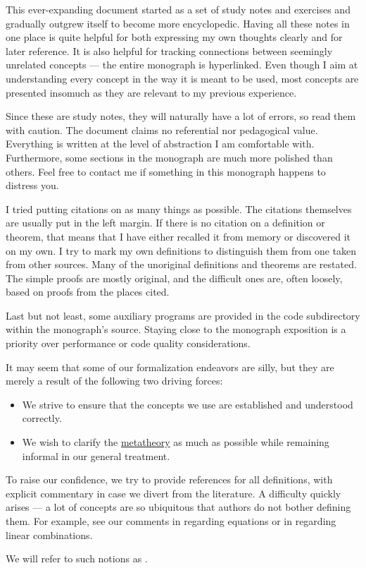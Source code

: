
This ever-expanding document started as a set of study notes and exercises and gradually outgrew itself to become more encyclopedic. Having all these notes in one place is quite helpful for both expressing my own thoughts clearly and for later reference. It is also helpful for tracking connections between seemingly unrelated concepts --- the entire monograph is hyperlinked. Even though I aim at understanding every concept in the way it is meant to be used, most concepts are presented insomuch as they are relevant to my previous experience.

Since these are study notes, they will naturally have a lot of errors, so read them with caution. The document claims no referential nor pedagogical value. Everything is written at the level of abstraction I am comfortable with. Furthermore, some sections in the monograph are much more polished than others. Feel free to contact me if something in this monograph happens to distress you.

I tried putting citations on as many things as possible. The citations themselves are usually put in the left margin. If there is no citation on a definition or theorem, that means that I have either recalled it from memory or discovered it on my own. I try to mark my own definitions to distinguish them from one taken from other sources. Many of the unoriginal definitions and theorems are restated. The simple proofs are mostly original, and the difficult ones are, often loosely, based on proofs from the places cited.

Last but not least, some auxiliary programs are provided in the code subdirectory within the monograph's source. Staying close to the monograph exposition is a priority over performance or code quality considerations.

\begin{concept}\label{con:assumed_knowledge}
  It may seem that some of our formalization endeavors are silly, but they are merely a result of the following two driving forces:
  \begin{itemize}
    \item We strive to ensure that the concepts we use are established and understood correctly.
    \item We wish to clarify the \hyperref[con:metalogic]{metatheory} as much as possible while remaining informal in our general treatment.
  \end{itemize}

  To raise our confidence, we try to provide references for all definitions, with explicit commentary in case we divert from the literature. A difficulty quickly arises --- a lot of concepts are so ubiquitous that authors do not bother defining them. For example, see our comments in  regarding equations or in  regarding linear combinations.

  We will refer to such notions as .
\end{concept}
